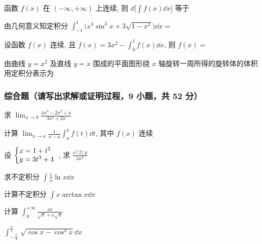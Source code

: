 \begin{ti}
	函数 $f(x)$ 在 $(-\infty,+\infty)$ 上连续, 则 $\dd\bigl[ \int f(x) \dd{x} \bigr]$ 等于 \hua
\end{ti}

\begin{ti}
	由几何意义知定积分 $\int_{-1}^1 \bigl( x^4 \sin^3 x + 3 \sqrt{1-x^2} \bigr) \dd{x} = $ \hua
\end{ti}

\begin{ti}
	设函数 $f(x)$ 连续, 且 $f(x) = 3x^2 - \int_0^1 f(x) \dd{x}$, 则 $f(x) = $ \hua
\end{ti}

\begin{ti}
	由曲线 $y=x^2$ 及直线 $y=x$ 围成的平面图形绕 $x$ 轴旋转一周所得的旋转体的体积用定积分表示为 \hua
\end{ti}

\subsubsection{综合题（请写出求解或证明过程，9 小题，共 52 分）}
\begin{ti}[6分]
	求 $\lim_{x \to 0} \frac{4x^3 - 2x^2 + x}{3x^2 + 2x}$
\end{ti}

\begin{ti}[6分]
	计算 $\lim_{x \to a} \frac{1}{x-a} \int_a^x f(t) \dd{t}$, 其中 $f(x)$ 连续
\end{ti}

\begin{ti}[6分]
	设 $\left\lbrace\begin{array}{@{}l}
		x = 1+t^2 \\
		y = 3t^3+4
	\end{array}\right.$, 求 $\frac{\dd[2]{y}}{\dd{x^2}}$
\end{ti}

\begin{ti}[5分]
	求不定积分 $\int \frac{1}{x} \ln x \dd{x}$
\end{ti}

\begin{ti}[5分]
	计算不定积分 $\int x \arctan x \dd{x}$
\end{ti}

\begin{ti}[6分]
	计算 $\int_0^{+\infty} \frac{\dd{x}}{\sqrt{x} + x\sqrt{x}}$
\end{ti}

\begin{ti}[6分]
	$\int_{-\frac{\uppi}{4}}^{\frac{\uppi}{2}} \sqrt{\cos x - \cos^3 x} \dd{x}$
\end{ti}

